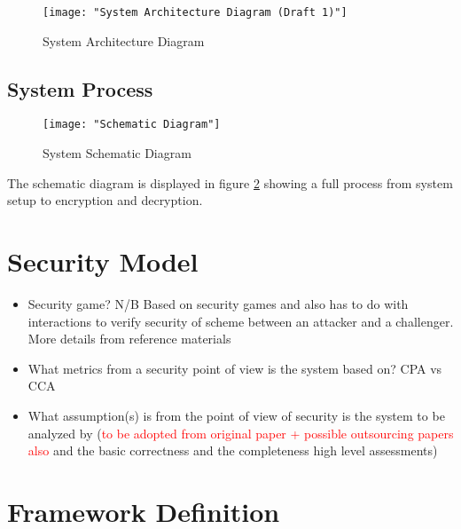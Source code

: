 \begin{figure}[h]
	\centering
	\texttt{[image: "System Architecture Diagram (Draft 1)"]}
	\caption{System Architecture Diagram}
	\label{fig:sysarch}
\end{figure}


\subsection{System Process}

\begin{figure}[h]
	\centering
	\texttt{[image: "Schematic Diagram"]}
	\caption{System Schematic Diagram}
	\label{fig:sysschem}
\end{figure}

The schematic diagram is displayed in figure \ref{fig:sysschem} showing a full process from system setup to encryption and decryption.


\section{Security Model}

\begin{itemize}
	\item Security game? N/B Based on security games and also has to do with interactions to verify security of scheme between an attacker and a challenger. More details from reference materials
	\item What metrics from a security point of view is the system based on? CPA vs CCA
	\item What assumption(s) is from the point of view of security is the system to be analyzed by (\textcolor{red}{to be adopted from original paper + possible outsourcing papers also} and the basic correctness and the completeness high level assessments)
\end{itemize}


\section{Framework Definition}

